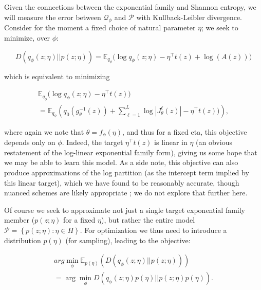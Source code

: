 \documentclass[twoside]{article}
\begin{document}
Given the connections between the exponential family and Shannon entropy, we will measure the error between $\mathcal{Q}_{\phi}$ and $\mathcal{P}$ with Kullback-Leibler divergence.  Consider for the moment a fixed choice of natural parameter $\eta$; we seek to minimize, over $\phi$:

{\small 
\begin{equation} D\left( q_\phi(z;\eta) || p(z;\eta) \right) = \mathbb{E}_{q_\phi} \Bigg( \log q_\phi(z;\eta) - \eta^\top t(z) + \log(A(z)) \Bigg) 
\label{eq:5}
\end{equation}}

which is equivalent to minimizing

{\small 
\begin{multline}  
\mathbb{E}_{q_\phi} \Bigg( \log q_\phi(z;\eta) - \eta^\top t(z) \Bigg) \\ = \mathbb{E}_{q_\phi} \left( q_0\left( g_\theta^{-1}(z)\right) + \sum_{\ell=1}^L  \log | J^\ell_\theta(z) | - \eta^\top t(z)) \right),
\label{eq:51}
\end{multline}}



where again we note that $\theta = f_\phi(\eta)$, and thus for a fixed eta, this objective depends only on $\phi$.  Indeed, the target $\eta^\top t(z)$ is linear in $\eta$ (an obvious restatement of the log-linear exponential family form), giving us some hope that we may be able to learn this model.  As a side note, this objective can also produce approximations of the log partition (as the intercept term implied by this linear target), which we have found to be reasonably accurate, though nuanced schemes are likely appropriate \citep{papamakarios2015distilling}; we do not explore that further here.

Of course we seek to approximate not just a single target exponential family member ($p(z;\eta)$ for a fixed $\eta$), but rather the entire model $\mathcal{P} = \left\{p(z;\eta): \eta \in H\right\}$.   For optimization we thus need to introduce a distribution $p(\eta)$ (for sampling), leading to the objective: 

{\small 
\begin{multline}
arg\!\min_{\!\!\!\!\!\!\!\!\!\!\!\phi} \mathbb{E}_{p(\eta)} \left( D\left( q_\phi(z;\eta) || p(z;\eta) \right)\right) \\ =  \arg\!\min_{\!\!\!\!\!\!\!\!\!\!\!\phi}  D\left( q_\phi(z;\eta)p(\eta) || p(z;\eta)p(\eta) \right). 
\label{eq:6}
\end{multline} }
\end{document}
